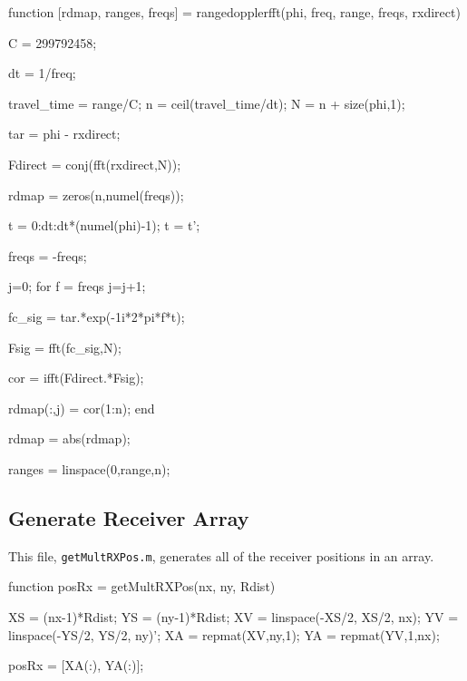 \documentclass[12pt,openany,a4paper]{book}
\begin{document}
\begin{spverbatim}

function [rdmap, ranges, freqs] = rangedopplerfft(phi, freq, range, freqs, rxdirect)


C = 299792458;

dt = 1/freq;

travel_time = range/C;
n = ceil(travel_time/dt); %
N = n + size(phi,1); %

tar = phi - rxdirect;

Fdirect = conj(fft(rxdirect,N)); %

rdmap = zeros(n,numel(freqs));

t = 0:dt:dt*(numel(phi)-1);
t = t';

freqs = -freqs;

j=0; %
for f = freqs
    j=j+1; %
    
    fc_sig = tar.*exp(-1i*2*pi*f*t);
    
    Fsig = fft(fc_sig,N);
    
    cor = ifft(Fdirect.*Fsig);
    
    rdmap(:,j) = cor(1:n);
end

rdmap = abs(rdmap);

ranges = linspace(0,range,n);
\end{spverbatim}


\subsection{Generate Receiver Array}
This file, \verb+getMultRXPos.m+, generates all of the receiver positions in an array.
\begin{spverbatim}
function posRx = getMultRXPos(nx, ny, Rdist)

XS = (nx-1)*Rdist;
YS = (ny-1)*Rdist;
XV = linspace(-XS/2, XS/2, nx);
YV = linspace(-YS/2, YS/2, ny)';
XA = repmat(XV,ny,1);
YA = repmat(YV,1,nx);

posRx = [XA(:), YA(:)];
\end{spverbatim}
\end{document}
